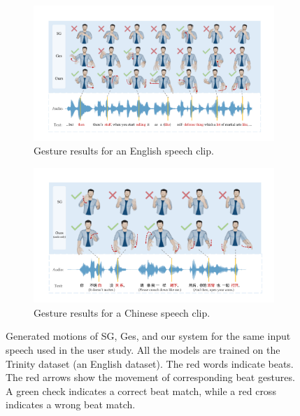 \begin{figure}[t]
    \centering
    \begin{subfigure}[t]{0.48\textwidth}
        \centering
        \includegraphics[width=\textwidth]{figures/fig9a.pdf}
        \caption{Gesture results for an English speech clip.}
        \label{fig:fig9a}
    \end{subfigure}
    \hspace{\fill}
    \begin{subfigure}[t]{0.48\textwidth}
        \centering
        \includegraphics[width=\textwidth]{figures/fig9b.pdf}
        \caption{Gesture results for a Chinese speech clip.}
        \label{fig:fig9b}
    \end{subfigure}
    \caption{Generated motions of SG, Ges, and our system for the same input speech used in the user study. All the models are trained on the Trinity dataset (an English dataset). The red words indicate beats. The red arrows show the movement of corresponding beat gestures. A green check indicates a correct beat match, while a red cross indicates a wrong beat match.}
    \label{fig:fig9}
    \Description{}
\end{figure}

